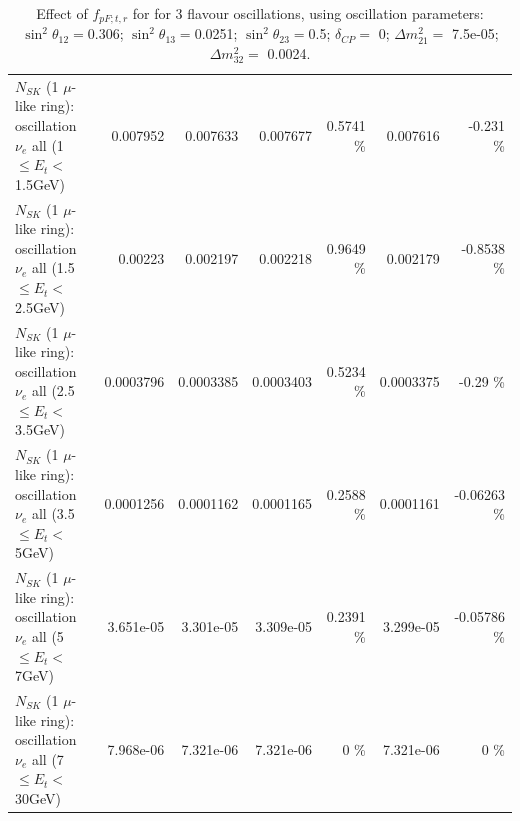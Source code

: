 \begin{table}
\begin{tabular}{| l | r | r | r  r | r  r |}
$N_{SK}$ (1 $\mu$-like ring): oscillation $\nu_{e}$ all (1 $\leq E_{t} <$ 1.5GeV) &        0.007952 &        0.007633 &        0.007677 &   0.5741 \%  &        0.007616 &   -0.231 \%  \\ 
$N_{SK}$ (1 $\mu$-like ring): oscillation $\nu_{e}$ all (1.5 $\leq E_{t} <$ 2.5GeV) &         0.00223 &        0.002197 &        0.002218 &   0.9649 \%  &        0.002179 &  -0.8538 \%  \\ 
$N_{SK}$ (1 $\mu$-like ring): oscillation $\nu_{e}$ all (2.5 $\leq E_{t} <$ 3.5GeV) &       0.0003796 &       0.0003385 &       0.0003403 &   0.5234 \%  &       0.0003375 &    -0.29 \%  \\ 
$N_{SK}$ (1 $\mu$-like ring): oscillation $\nu_{e}$ all (3.5 $\leq E_{t} <$ 5GeV) &       0.0001256 &       0.0001162 &       0.0001165 &   0.2588 \%  &       0.0001161 & -0.06263 \%  \\ 
 $N_{SK}$ (1 $\mu$-like ring): oscillation $\nu_{e}$ all (5 $\leq E_{t} <$ 7GeV) &       3.651e-05 &       3.301e-05 &       3.309e-05 &   0.2391 \%  &       3.299e-05 & -0.05786 \%  \\ 
$N_{SK}$ (1 $\mu$-like ring): oscillation $\nu_{e}$ all (7 $\leq E_{t} <$ 30GeV) &       7.968e-06 &       7.321e-06 &       7.321e-06 &        0 \%  &       7.321e-06 &        0 \%  \\ 
\hline
\hline
\end{tabular}
\caption{ Effect of $f_{pF; t, r}$ for for 3 flavour oscillations, using oscillation parameters:  $\sin^2\theta_{12} = $0.306; $\sin^2\theta_{13} = $0.0251; $\sin^2\theta_{23} = $0.5; $\delta_{CP} = $        0; $\Delta m^2_{21} = $    7.5e-05; $\Delta m^2_{32} = $    0.0024. }
\label{tab:num_xsec_pf_1RmuT_3f_osc_t13:0.0251}
\end{table}
\clearpage
